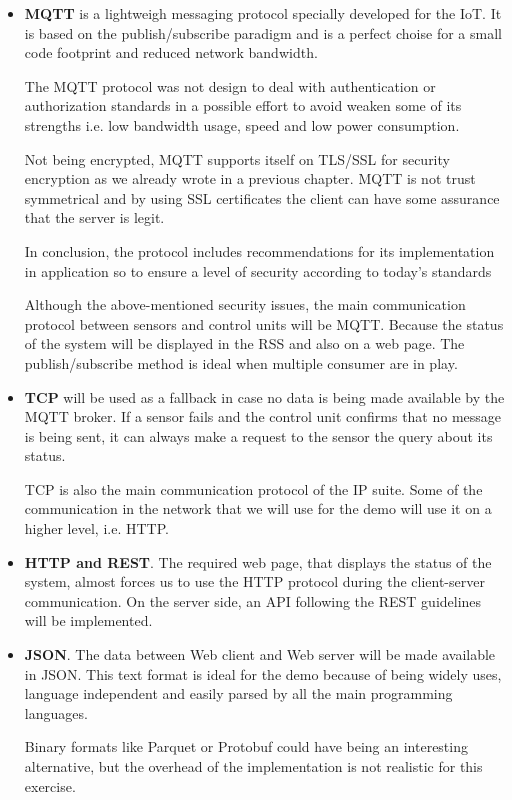 \documentclass[11pt]{article}
\begin{document}
\begin{itemize}
	\item \textbf{MQTT} is a lightweigh messaging protocol specially developed for the IoT. It is based on the publish/subscribe paradigm and is a perfect choise for a small code footprint and reduced network bandwidth.
	
The MQTT protocol was not design to deal with authentication or authorization standards in a possible effort to avoid weaken some of its strengths i.e. low bandwidth usage, speed and low power consumption.

Not being encrypted, MQTT supports itself on TLS/SSL for security encryption as we already wrote in a previous chapter. MQTT is not trust symmetrical and by using SSL certificates the client can have some assurance that the 
server is legit.

In conclusion, the protocol includes recommendations for its implementation in application so to ensure a level of security according to today’s standards

Although the above-mentioned security issues, the main communication protocol between sensors and control units will be MQTT. Because the status of the system will be displayed in the RSS and also on a web page. The publish/subscribe method is ideal when multiple consumer are in play.

	\item \textbf{TCP} will be used as a fallback in case no data is being made available by the MQTT broker. If a sensor fails and the control unit confirms that no message is being sent, it can always make a request to the sensor the query about its status.

TCP is also the main communication protocol of the IP suite. Some of the communication in the network that we will use for the demo will use it on a higher level, i.e. HTTP.

	\item \textbf{HTTP and REST}. The required web page, that displays the status of the system, almost forces us to use the HTTP protocol during the client-server communication. On the server side, an API following the REST guidelines will be implemented.

	\item \textbf{JSON}. The data between Web client and Web server will be made available in JSON. This text format is ideal for the demo because of being widely uses, language independent and easily parsed by all the main programming languages.

	Binary formats like Parquet or Protobuf could have being an interesting alternative, but the overhead of the implementation is not realistic for this exercise.
	
\end{itemize}
\end{document}
